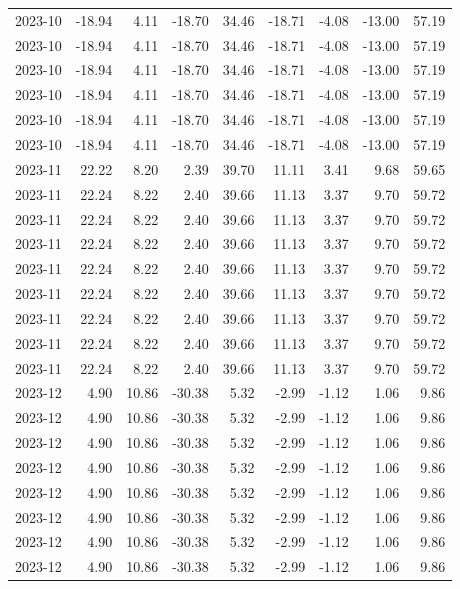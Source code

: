 \begin{table}[ht]
\begin{tabular}{lrrrrrrrr}
  2023-10 & -18.94 & 4.11 & -18.70 & 34.46 & -18.71 & -4.08 & -13.00 & 57.19 \\ 
  2023-10 & -18.94 & 4.11 & -18.70 & 34.46 & -18.71 & -4.08 & -13.00 & 57.19 \\ 
  2023-10 & -18.94 & 4.11 & -18.70 & 34.46 & -18.71 & -4.08 & -13.00 & 57.19 \\ 
  2023-10 & -18.94 & 4.11 & -18.70 & 34.46 & -18.71 & -4.08 & -13.00 & 57.19 \\ 
  2023-10 & -18.94 & 4.11 & -18.70 & 34.46 & -18.71 & -4.08 & -13.00 & 57.19 \\ 
  2023-10 & -18.94 & 4.11 & -18.70 & 34.46 & -18.71 & -4.08 & -13.00 & 57.19 \\ 
  2023-11 & 22.22 & 8.20 & 2.39 & 39.70 & 11.11 & 3.41 & 9.68 & 59.65 \\ 
  2023-11 & 22.24 & 8.22 & 2.40 & 39.66 & 11.13 & 3.37 & 9.70 & 59.72 \\ 
  2023-11 & 22.24 & 8.22 & 2.40 & 39.66 & 11.13 & 3.37 & 9.70 & 59.72 \\ 
  2023-11 & 22.24 & 8.22 & 2.40 & 39.66 & 11.13 & 3.37 & 9.70 & 59.72 \\ 
  2023-11 & 22.24 & 8.22 & 2.40 & 39.66 & 11.13 & 3.37 & 9.70 & 59.72 \\ 
  2023-11 & 22.24 & 8.22 & 2.40 & 39.66 & 11.13 & 3.37 & 9.70 & 59.72 \\ 
  2023-11 & 22.24 & 8.22 & 2.40 & 39.66 & 11.13 & 3.37 & 9.70 & 59.72 \\ 
  2023-11 & 22.24 & 8.22 & 2.40 & 39.66 & 11.13 & 3.37 & 9.70 & 59.72 \\ 
  2023-11 & 22.24 & 8.22 & 2.40 & 39.66 & 11.13 & 3.37 & 9.70 & 59.72 \\ 
  2023-12 & 4.90 & 10.86 & -30.38 & 5.32 & -2.99 & -1.12 & 1.06 & 9.86 \\ 
  2023-12 & 4.90 & 10.86 & -30.38 & 5.32 & -2.99 & -1.12 & 1.06 & 9.86 \\ 
  2023-12 & 4.90 & 10.86 & -30.38 & 5.32 & -2.99 & -1.12 & 1.06 & 9.86 \\ 
  2023-12 & 4.90 & 10.86 & -30.38 & 5.32 & -2.99 & -1.12 & 1.06 & 9.86 \\ 
  2023-12 & 4.90 & 10.86 & -30.38 & 5.32 & -2.99 & -1.12 & 1.06 & 9.86 \\ 
  2023-12 & 4.90 & 10.86 & -30.38 & 5.32 & -2.99 & -1.12 & 1.06 & 9.86 \\ 
  2023-12 & 4.90 & 10.86 & -30.38 & 5.32 & -2.99 & -1.12 & 1.06 & 9.86 \\ 
  2023-12 & 4.90 & 10.86 & -30.38 & 5.32 & -2.99 & -1.12 & 1.06 & 9.86 \\ 

\end{tabular}
\end{table}
